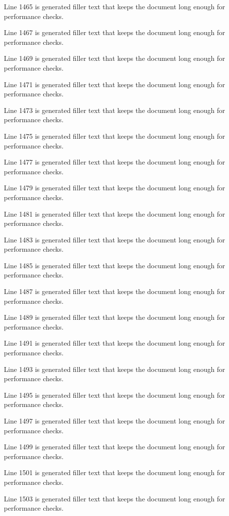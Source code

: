Line 1465 is generated filler text that keeps the document long enough for performance checks.

Line 1467 is generated filler text that keeps the document long enough for performance checks.

Line 1469 is generated filler text that keeps the document long enough for performance checks.

Line 1471 is generated filler text that keeps the document long enough for performance checks.

Line 1473 is generated filler text that keeps the document long enough for performance checks.

Line 1475 is generated filler text that keeps the document long enough for performance checks.

Line 1477 is generated filler text that keeps the document long enough for performance checks.

Line 1479 is generated filler text that keeps the document long enough for performance checks.

Line 1481 is generated filler text that keeps the document long enough for performance checks.

Line 1483 is generated filler text that keeps the document long enough for performance checks.

Line 1485 is generated filler text that keeps the document long enough for performance checks.

Line 1487 is generated filler text that keeps the document long enough for performance checks.

Line 1489 is generated filler text that keeps the document long enough for performance checks.

Line 1491 is generated filler text that keeps the document long enough for performance checks.

Line 1493 is generated filler text that keeps the document long enough for performance checks.

Line 1495 is generated filler text that keeps the document long enough for performance checks.

Line 1497 is generated filler text that keeps the document long enough for performance checks.

Line 1499 is generated filler text that keeps the document long enough for performance checks.

Line 1501 is generated filler text that keeps the document long enough for performance checks.

Line 1503 is generated filler text that keeps the document long enough for performance checks.

